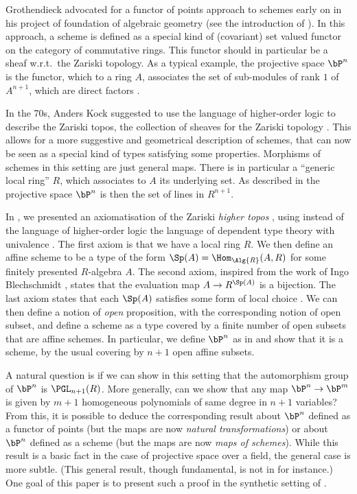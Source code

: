 Grothendieck advocated for a functor of points approach to schemes early on in his
project of foundation of algebraic geometry (see the introduction of \cite{EGAI}).
In this approach, a scheme is defined as a special kind of (covariant) set valued functor
on the category of commutative rings. This functor should in particular
be a sheaf w.r.t.\ the Zariski topology. As a typical example, the projective space $\bP^n$
is the functor, which to a ring $A$,
associates the set of sub-modules of  rank $1$ of $A^{n+1}$, which are direct factors \cite{Demazure,Eisenbud,Jantzen}.

In the 70s, Anders Kock suggested to use the language of higher-order logic \cite{Church40}
to describe the Zariski topos, the collection of sheaves for the Zariski topology \cite{Kock74,kockreyes}.
This allows for
a more suggestive and geometrical description of schemes, that can now be seen as a special kind
of types satisfying some properties. Morphisms of schemes in this setting are just general maps.
There is in particular a ``generic
local ring'' $R$, which associates to $A$ its underlying set. As described in \cite{kockreyes}
the projective space $\bP^n$ is then the set of lines in $R^{n+1}$.

In \cite{draft}, we presented an axiomatisation of the Zariski {\em higher topos} \cite{lurie-htt},
using instead of the language of higher-order logic the language of dependent type theory
with univalence \cite{hott}. The first axiom is that we have a local ring $R$. We then define
an affine scheme to be a type of the form $\Sp(A) = \Hom_{\Alg{R}}(A,R)$ for some finitely presented
$R$-algebra $A$. The second axiom, inspired from the work of Ingo Blechschmidt \cite{ingo-thesis},
states that the evaluation map $A\rightarrow R^{\Sp(A)}$ is a bijection. The last axiom states
that each $\Sp(A)$ satisfies some form of local choice \cite{draft}. We can then define a notion
of {\em open} proposition, with the corresponding notion of open subset, and define a scheme as a type
covered by a finite number of open subsets that are affine schemes. In particular, we define
$\bP^n$ as in \cite{kockreyes} and show that it is a scheme, by the usual covering by $n+1$
open affine subsets.%

A natural question is if we can show in this setting that the automorphism group of $\bP^n$
is  $\PGL_{n+1}(R)$.
More generally, can we show that any map $\bP^n\rightarrow \bP^m$ is given by $m+1$ homogeneous
polynomials of same degree in $n+1$ variables?
From this, it is possible to deduce the corresponding result about $\bP^n$ defined as
a functor of points (but the maps are now {\em natural transformations}) or about $\bP^n$ defined
as a scheme (but the maps are now {\em maps of schemes}).
While this result is a basic fact in the case of projective space over a field, the general
case is more subtle.
(This general result, though fundamental, is not in \cite{Hartshorne} for instance.)
One goal of this paper is to present such a proof in the synthetic setting of \cite{draft}.

